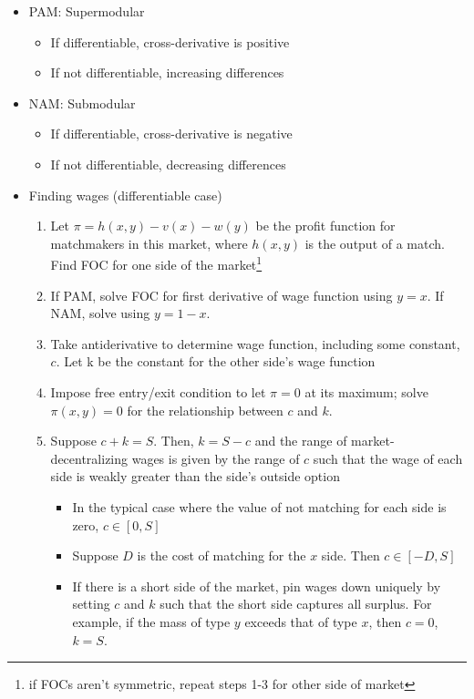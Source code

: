 \documentclass{article}
\begin{document}
\begin{itemize}
	\item PAM: Supermodular
		\begin{itemize}
			\item If differentiable, cross-derivative is positive
			\item If not differentiable, increasing differences 
		\end{itemize}
	\item NAM: Submodular
		\begin{itemize}
			\item If differentiable, cross-derivative is negative
			\item If not differentiable, decreasing differences 
		\end{itemize}
	
	

	\item Finding wages (differentiable case)
		\begin{enumerate}
			\item Let $\pi=h(x,y)-v(x)-w(y)$ be the profit function for matchmakers in this market, where $h(x,y)$ is the output of a match. Find FOC for one side of the market\footnote{if FOCs aren’t symmetric, repeat steps 1-3 for other side of market}
			\item If PAM, solve FOC for first derivative of wage function using $y=x$. If NAM, solve using $y=1-x$.
			\item Take antiderivative to determine wage function, including some constant, $c$. Let k be the constant for the other side’s wage function
			\item Impose free entry/exit condition to let $\pi=0$ at its maximum; solve $\pi(x,y)=0$ for the relationship between $c$ and $k$. 
			\item Suppose $c+k=S$. Then, $k=S-c$ and the range of market-decentralizing wages is given by the range of $c$ such that the wage of each side is weakly greater than the side’s outside option
				\begin{itemize}
					\item In the typical case where the value of not matching for each side is zero, $c\in[0,S]$
					\item Suppose $D$ is the cost of matching for the $x$ side. Then $c\in[-D,S]$
					\item If there is a short side of the market, pin wages down uniquely by setting $c$ and $k$ such that the short side captures all surplus. For example, if the mass of type $y$ exceeds that of type $x$, then $c=0$, $k=S$.
				\end{itemize}
		\end{enumerate}
\end{itemize}

\end{document}
